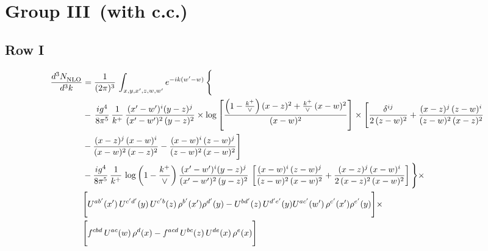 \documentclass[9pt]{article}
\numberwithin{equation}{section}
\begin{document}

\section{Group III\, (with c.c.)}
\subsection{Row I}
\begin{align}
     \frac{d^{3}N_{\rm NLO}^{\rm}}{d^{3}k}  & =   \frac{1}{(2\pi)^{3}}\, \int_{x,y,x',z,w,w^{\prime}} e^{-ik(w^{\prime}-w)}\, \Bigg\{\notag \\
& -\,\frac{ig^{4}}{8\pi^{5}}\,\frac{1}{k^{+}}\,\frac{(x'-w')^{i}(y-z)^{j}}{(x'-w')^{2}\,(y-z)^{2}}\times \log{\left[\frac{\left(1-\frac{k^{+}}{\vee}\right)(x-z)^{2}+\frac{k^{+}}{\vee}\,(x-w)^{2}}{(x-w)^{2}}\right]}\times \Bigg[\frac{\delta^{ij}}{2\,(z-w)^{2}}+\frac{(x-z)^{j}\,(z-w)^{i}}{(z-w)^{2}\,(x-z)^{2}}\notag \\ & -\frac{(x-z)^{j}\,(x-w)^{i}}{(x-w)^{2}\,(x-z)^{2}}-\frac{(x-w)^{i}\,(z-w)^{j}}{(z-w)^{2}\,(x-w)^{2}}\Bigg] \notag \\
& -\frac{ig^{4}}{8\pi^{5}}\,\frac{1}{k^{+}}\,\log{\left(1-\frac{k^{+}}{\vee}\right)}\,\frac{(x'-w')^{i}(y-z)^{j}}{(x'-w')^{2}\,(y-z)^{2}}\,\left[\frac{(x-w)^{i}\,(z-w)^{j}}{(z-w)^{2}\,(x-w)^{2}}+\frac{(x-z)^{j}\,(x-w)^{i}}{2\,(x-z)^{2}\, (x-w)^{2}}\right]\Bigg\}\times \notag \\ &  \Bigg[U^{ab'}(x')\,U^{c'd'}(y)\,U^{c'b}(z)\,\rho^{b'}(x')\rho^{d'}(y)-U^{bd'}(z)\,U^{d'e'}(y)U^{ac'}(w')\,\rho^{c'}(x')\rho^{e'}(y)\Bigg]\times\notag \\ & \Bigg[f^{cbd}\,U^{ac}(w)\,\rho^{d}(x)-f^{acd}\, U^{bc}(z)\,U^{de}(x)\,\rho^{e}(x)\Bigg]
\end{align}
\end{document}
